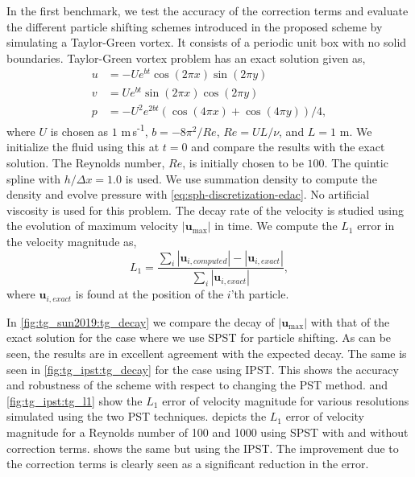 \documentclass[preprint,12pt]{elsarticle}
\newcommand{\ten}[1]{\ensuremath{\mathbf{#1}}}
\begin{document}
In the first benchmark, we test the accuracy of the correction terms and
evaluate the different particle shifting schemes introduced in the proposed
scheme by simulating a Taylor-Green vortex. It consists of a periodic unit box
with no solid boundaries. Taylor-Green vortex problem has an exact solution
given as,
\begin{align}
  \label{eq:tgv_sol}
  u &= - U e^{bt} \cos(2 \pi x) \sin(2 \pi y) \\
  v &=   U e^{bt}\sin(2 \pi x) \cos(2 \pi y) \\
  p &=  -U^2 e^{2bt} (\cos(4 \pi x) + \cos(4 \pi y))/4,
\end{align}
where $U$ is chosen as $1$ m\,s\textsuperscript{-1}, $b=-8\pi^2/Re$, $Re=U L /\nu$,
and $L=1$ m. We initialize the fluid using this at $t=0$ and compare the
results with the exact solution. The Reynolds number, $Re$, is initially
chosen to be $100$. The quintic spline with $h/\Delta x = 1.0$ is used. We use
summation density to compute the density and evolve pressure with
\cref{eq:sph-discretization-edac}. No artificial viscosity is used for this
problem.
%
%
The decay rate of the velocity is studied using the evolution of maximum
velocity $|\ten{u}_{\max}|$ in time. We compute the $L_1$ error in the
velocity magnitude as,
\begin{equation}
  \label{eq:tg:l1}
  L_1 = \frac{\sum_i |\ten{u}_{i, computed}| - |\ten{u}_{i, exact}|}
  {\sum_i |\ten{u}_{i, exact}|},
\end{equation}
where $\ten{u}_{i, exact}$ is found at the position of the $i$'th particle.


In \cref{fig:tg_sun2019:tg_decay} we compare the decay of $|\ten{u}_{\max}|$
with that of the exact solution for the case where we use SPST for particle
shifting. As can be seen, the results are in excellent agreement with the
expected decay. The same is seen in \cref{fig:tg_ipst:tg_decay} for the case
using IPST. This shows the accuracy and robustness of the scheme with respect
to changing the PST method.  and
\cref{fig:tg_ipst:tg_l1} show the $L_1$ error of velocity magnitude for
various resolutions simulated using the two PST techniques.
 depicts the $L_1$ error of velocity
magnitude for a Reynolds number of 100 and 1000 using SPST with and without
correction terms.  shows the same but
using the IPST. The improvement due to the correction terms is clearly seen
as a significant reduction in the error.
\end{document}
